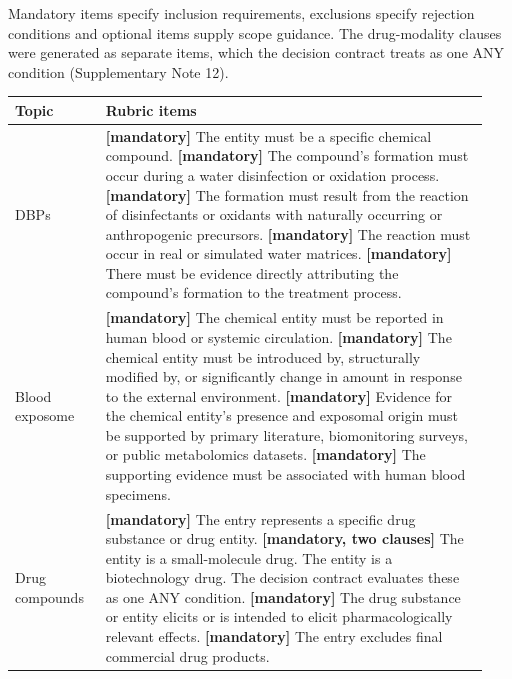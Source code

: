 \documentclass[10pt]{article}
\begin{document}
Mandatory items specify inclusion requirements, exclusions specify rejection conditions and optional items supply scope guidance. The drug-modality clauses were generated as separate items, which the decision contract treats as one ANY condition (Supplementary Note 12).

\begin{longtable}{p{0.18\linewidth}p{0.76\linewidth}}
\toprule
Topic & Rubric items \\
\midrule
DBPs &
\textbf{[mandatory]} The entity must be a specific chemical compound.\newline
\textbf{[mandatory]} The compound's formation must occur during a water disinfection or oxidation process.\newline
\textbf{[mandatory]} The formation must result from the reaction of disinfectants or oxidants with naturally occurring or anthropogenic precursors.\newline
\textbf{[mandatory]} The reaction must occur in real or simulated water matrices.\newline
\textbf{[mandatory]} There must be evidence directly attributing the compound's formation to the treatment process.
\\
Blood exposome &
\textbf{[mandatory]} The chemical entity must be reported in human blood or systemic circulation.\newline
\textbf{[mandatory]} The chemical entity must be introduced by, structurally modified by, or significantly change in amount in response to the external environment.\newline
\textbf{[mandatory]} Evidence for the chemical entity's presence and exposomal origin must be supported by primary literature, biomonitoring surveys, or public metabolomics datasets.\newline
\textbf{[mandatory]} The supporting evidence must be associated with human blood specimens.
\\
Drug compounds &
\textbf{[mandatory]} The entry represents a specific drug substance or drug entity.\newline
\textbf{[mandatory, two clauses]} The entity is a small-molecule drug. The entity is a biotechnology drug. The decision contract evaluates these as one ANY condition.\newline
\textbf{[mandatory]} The drug substance or entity elicits or is intended to elicit pharmacologically relevant effects.\newline
\textbf{[mandatory]} The entry excludes final commercial drug products.\newline

\end{longtable}
\end{document}
